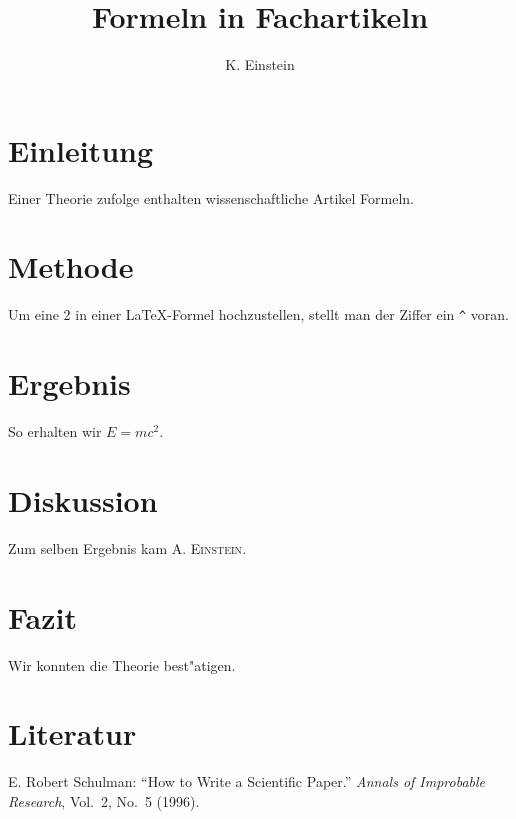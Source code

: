 \documentclass[a4paper]{article}
\begin{document}
\author{K. Einstein}
\title{Formeln in Fachartikeln}
\maketitle
\section{Einleitung}
Einer Theorie zufolge enthalten 
wissenschaftliche Artikel Formeln.
\section{Methode}
Um eine 2 in einer \LaTeX-Formel 
hochzustellen, stellt man der 
Ziffer ein \verb+^+ voran.
\section{Ergebnis}
So erhalten wir \(E=mc^2\).
\section{Diskussion}
Zum selben Ergebnis kam 
\textsc{A. Einstein}.
\section{Fazit}
Wir konnten die Theorie best"atigen.
\section*{Literatur}
E. Robert Schulman: ``How to Write a 
Scientific Paper.'' \textit{Annals of 
Improbable Research}, Vol.~2, No.~5
(1996).
\end{document}
